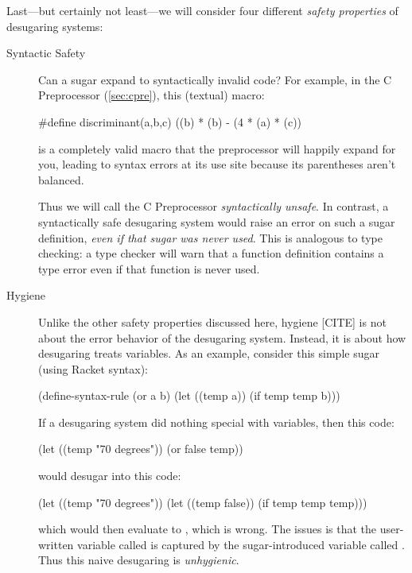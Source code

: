 Last---but certainly not least---we will consider four different
\emph{safety properties} of desugaring systems:
\begin{description}
  \item[Syntactic Safety] Can a sugar expand to syntactically invalid
    code? For example, in the C Preprocessor (\cref{sec:cpre}), this
    (textual) macro:
\begin{CorrectlyIndentedCodes}
#define discriminant(a,b,c) ((b) * (b) - (4 * (a) * (c))
\end{CorrectlyIndentedCodes}
    is a completely valid macro that the preprocessor will happily
    expand for you, leading to syntax errors at its use site because
    its parentheses aren't balanced.

    Thus we will call the C Preprocessor \emph{syntactically unsafe}.
    In contrast, a syntactically safe desugaring system would raise an
    error on such a sugar definition, \emph{even if that sugar was
      never used}. This is analogous to type checking: a type checker
    will warn that a function definition contains a type error even
    if that function is never used.
  \item[Hygiene] Unlike the other safety properties discussed here,
    hygiene [CITE] is not about the error behavior of the desugaring
    system.  Instead, it is about how desugaring treats variables. As
    an example, consider this simple  sugar (using Racket
    syntax):
\begin{CorrectlyIndentedCodes}
(define-syntax-rule
  (or a b)
  (let ((temp a)) (if temp temp b)))
\end{CorrectlyIndentedCodes}
    If a desugaring system did nothing special with variables, then
    this code:
\begin{CorrectlyIndentedCodes}
(let ((temp "70 degrees"))
  (or false temp))
\end{CorrectlyIndentedCodes}
    would desugar into this code:
\begin{CorrectlyIndentedCodes}
(let ((temp "70 degrees"))
  (let ((temp false)) (if temp temp temp)))
\end{CorrectlyIndentedCodes}
    which would then evaluate to , which is wrong. The
    issues is that the user-written variable called  is
    captured by the sugar-introduced variable called .
    Thus this naive desugaring is \emph{unhygienic}.
    

\end{description}
